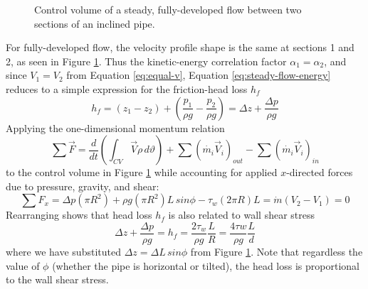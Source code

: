 \documentclass[10pt]{article} %
\numberwithin{equation}{section} %
\begin{document}
\begin{multicols}{2}
\begin{figure}[h]
\caption{Control volume of a steady, fully-developed flow between two sections of an inclined pipe.}
\label{fig:inclined-pipe}
\end{figure}
For fully-developed flow, the velocity profile shape is the same at sections 1 and 2, as seen in Figure \ref{fig:inclined-pipe}. Thus the kinetic-energy correlation factor $\alpha_{1} = \alpha_{2}$, and since $V_{1} = V_{2}$ from Equation \ref{eq:equal-v}, Equation \ref{eq:steady-flow-energy} reduces to a simple expression for the friction-head loss $h_{f}$ \cite{fluid-mechanics}
\begin{equation}
h_{f} = (z_{1} - z_{2}) + \left( \frac{p_{1}}{\rho g} - \frac{p_{2}}{\rho g} \right) = \Delta z + \frac{\Delta p}{\rho g}
\end{equation}
Applying the one-dimensional momentum relation
\begin{equation}
\sum \vec{F} = \frac{d}{dt} \left( \int_{CV} \vec{V} \rho\, d\vartheta \right) + \sum (\dot{m_{i}} \vec{V}_{i})_{out} - \sum (\dot{m_{i}} \vec{V}_{i})_{in}
\end{equation}
to the control volume in Figure \ref{fig:inclined-pipe} while accounting for applied $x$-directed forces due to pressure, gravity, and shear:
\begin{equation}
\sum F_{x} = \Delta p (\pi R^{2}) + \rho g (\pi R^{2}) L\, sin \phi - \tau_{w}(2 \pi R)L = \dot{m} (V_{2} - V_{1}) = 0
\end{equation}
Rearranging shows that head loss $h_{f}$ is also related to wall shear stress
\begin{equation} \label{eq:wall-shear-stress}
\Delta z + \frac{\Delta p}{\rho g} = h_{f} = \frac{2 \tau_{w}}{\rho g} \frac{L}{R} = \frac{4 \tau{w}}{\rho g} \frac{L}{d}
\end{equation}
where we have substituted $\Delta z = \Delta L\, sin \phi$ from Figure \ref{fig:inclined-pipe}. Note that regardless the value of $\phi$ (whether the pipe is horizontal or tilted), the head loss is proportional to the wall shear stress.


\end{multicols}
\end{document}
